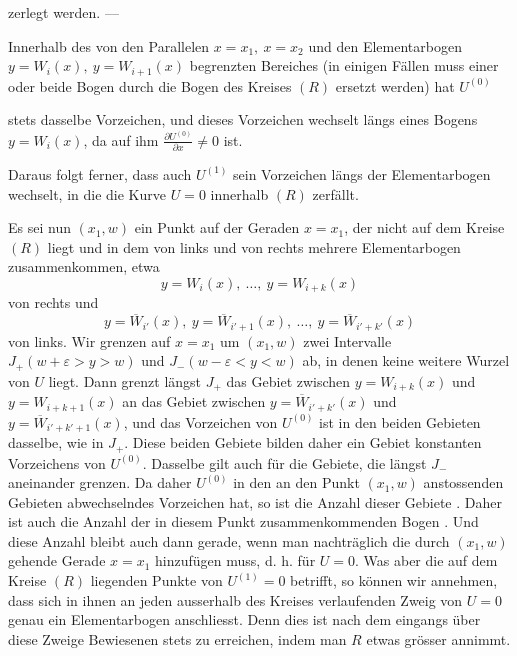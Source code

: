 zerlegt werden. —
\par
Innerhalb des von den Parallelen \(x=x_1,\ x=x_2\) und den Elementarbogen
\(y=W_i(x),\ y=W_{i+1}(x)\) begrenzten Bereiches (in einigen Fällen muss einer
oder beide Bogen durch die Bogen des Kreises \((R)\) ersetzt werden) hat \(U^{(0)}\)\par
\clearpage{}
\noindent stets dasselbe Vorzeichen, und dieses Vorzeichen wechselt längs eines Bogens
\(y=W_i(x)\), da auf ihm \(\frac{\partial U^{(0)}}{\partial x}\ne0\) ist.
\par
Daraus folgt ferner, dass auch \(U^{(1)}\) sein Vorzeichen längs der Elementarbogen
wechselt, in die die Kurve \(U=0\) innerhalb \((R)\) zerfällt.
\par
Es sei nun \((x_1,w)\) ein Punkt auf der Geraden \(x=x_1\), der nicht auf dem
Kreise \((R)\) liegt und in dem von links und von rechts mehrere Elementarbogen
zusammenkommen, etwa
\[
y=W_i(x),\ \ldots,\ y=W_{i+k}(x)
\]
von rechts und
\[
y=\overline{W}_{i'}(x),\ y=\overline{W}_{i'+1}(x),\ \ldots,\ y=\overline{W}_{i'+k'}(x)
\]
von links. Wir grenzen auf \(x=x_1\) um \((x_1,w)\) zwei Intervalle \(J_+(w+\varepsilon>y>w)\)
und \(J_-(w-\varepsilon<y<w)\) ab, in denen keine weitere Wurzel von \(U\) liegt. Dann
grenzt längst \(J_+\) das Gebiet zwischen \(y=W_{i+k}(x)\) und \(y=W_{i+k+1}(x)\) an
das Gebiet zwischen \(y=\overline{W}_{i'+k'}(x)\) und \(y=\overline{W}_{i'+k'+1}(x)\), und das Vorzeichen
von \(U^{(0)}\) ist in den beiden Gebieten dasselbe, wie in \(J_+\). Diese beiden Gebiete
bilden daher ein Gebiet konstanten Vorzeichens von \(U^{(0)}\). Dasselbe gilt auch
für die Gebiete, die längst \(J_-\) aneinander grenzen. Da daher \(U^{(0)}\) in den an
den Punkt \((x_1,w)\) anstossenden Gebieten abwechselndes Vorzeichen hat, so ist
die Anzahl dieser Gebiete . Daher ist auch die Anzahl der in diesem
Punkt zusammenkommenden Bogen . Und diese Anzahl bleibt auch
dann gerade, wenn man nachträglich die durch \((x_1,w)\) gehende Gerade \(x=x_1\)
hinzufügen muss, d. h. für \(U=0\). Was aber die auf dem Kreise \((R)\) liegenden
Punkte von \(U^{(1)}=0\) betrifft, so können wir annehmen, dass sich in ihnen an
jeden ausserhalb des Kreises verlaufenden Zweig von \(U=0\) genau ein Elementarbogen
anschliesst. Denn dies ist nach dem eingangs über diese Zweige
Bewiesenen stets zu erreichen, indem man \(R\) etwas grösser annimmt.
\par
